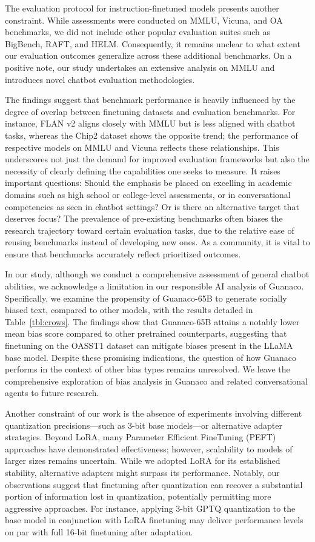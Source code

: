 The evaluation protocol for instruction-finetuned models presents another constraint. While assessments were conducted on MMLU, Vicuna, and OA benchmarks, we did not include other popular evaluation suites such as BigBench, RAFT, and HELM. Consequently, it remains unclear to what extent our evaluation outcomes generalize across these additional benchmarks. On a positive note, our study undertakes an extensive analysis on MMLU and introduces novel chatbot evaluation methodologies.

The findings suggest that benchmark performance is heavily influenced by the degree of overlap between finetuning datasets and evaluation benchmarks. For instance, FLAN v2 aligns closely with MMLU but is less aligned with chatbot tasks, whereas the Chip2 dataset shows the opposite trend; the performance of respective models on MMLU and Vicuna reflects these relationships. This underscores not just the demand for improved evaluation frameworks but also the necessity of clearly defining the capabilities one seeks to measure. It raises important questions: Should the emphasis be placed on excelling in academic domains such as high school or college-level assessments, or in conversational competencies as seen in chatbot settings? Or is there an alternative target that deserves focus? The prevalence of pre-existing benchmarks often biases the research trajectory toward certain evaluation tasks, due to the relative ease of reusing benchmarks instead of developing new ones. As a community, it is vital to ensure that benchmarks accurately reflect prioritized outcomes.

In our study, although we conduct a comprehensive assessment of general chatbot abilities, we acknowledge a limitation in our responsible AI analysis of {Guanaco}. Specifically, we examine the propensity of {Guanaco}-65B to generate socially biased text, compared to other models, with the results detailed in Table~\ref{tbl:crows}. The findings show that {Guanaco}-65B attains a notably lower mean bias score compared to other pretrained counterparts, suggesting that finetuning on the OASST1 dataset can mitigate biases present in the LLaMA base model. Despite these promising indications, the question of how {Guanaco} performs in the context of other bias types remains unresolved. We leave the comprehensive exploration of bias analysis in {Guanaco} and related conversational agents to future research.

Another constraint of our work is the absence of experiments involving different quantization precisions—such as 3-bit base models—or alternative adapter strategies. Beyond LoRA, many Parameter Efficient FineTuning (PEFT) approaches have demonstrated effectiveness; however, scalability to models of larger sizes remains uncertain. While we adopted LoRA for its established stability, alternative adapters might surpass its performance. Notably, our observations suggest that finetuning after quantization can recover a substantial portion of information lost in quantization, potentially permitting more aggressive approaches. For instance, applying 3-bit GPTQ quantization to the base model in conjunction with LoRA finetuning may deliver performance levels on par with full 16-bit finetuning after adaptation.

